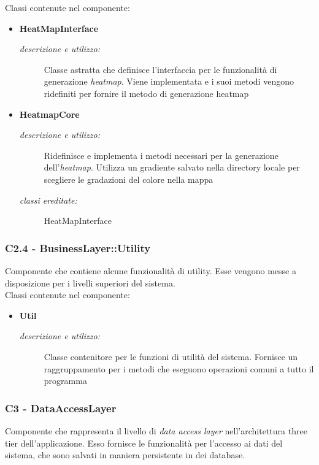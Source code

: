 Classi contenute nel componente: 
\begin{itemize} 
\item \textbf{HeatMapInterface}
\begin{description}
\item [\textit{descrizione e utilizzo:}] Classe astratta che definisce l'interfaccia per le funzionalità di generazione \textit{heatmap}. Viene implementata e i suoi metodi vengono ridefiniti per fornire il metodo di generazione heatmap
\end{description}
\item \textbf{HeatmapCore}
\begin{description}
\item [\textit{descrizione e utilizzo:}] Ridefinisce e implementa i metodi necessari per la generazione dell'\textit{heatmap}. Utilizza un gradiente salvato nella directory locale per scegliere le gradazioni del colore nella mappa
\item [\textit{classi ereditate:}] HeatMapInterface
\end{description}
\end{itemize}

\subsubsection{C2.4 - BusinessLayer::Utility} \label{sec:c2.4}
Componente che contiene alcune funzionalità di utility. Esse vengono messe a disposizione per i livelli superiori del sistema.\\
Classi contenute nel componente: 
\begin{itemize} 
\item \textbf{Util}
\begin{description}
\item [\textit{descrizione e utilizzo:}] Classe contenitore per le funzioni di utilità del sistema. Fornisce un raggruppamento per i metodi che eseguono operazioni comuni a tutto il programma
\end{description}
\end{itemize}

\subsubsection{C3 - DataAccessLayer} \label{sec:c3}
Componente che rappresenta il livello di \textit{data access layer} nell'architettura three tier dell'applicazione. Esso fornisce le funzionalità per l'accesso ai dati del sistema, che sono salvati in maniera persistente in dei database. 
\\
